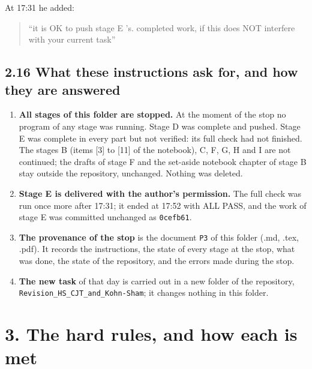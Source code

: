 \documentclass[
  10pt,
]{article}
\providecommand{\tightlist}{%
  \setlength{\itemsep}{0pt}\setlength{\parskip}{0pt}}
\begin{document}
At 17:31 he added:

\begin{quote}
``it is OK to push stage E 's. completed work, if this does NOT
interfere with your current task''
\end{quote}

\hypertarget{what-these-instructions-ask-for-and-how-they-are-answered}{%
\subsection{2.16 What these instructions ask for, and how they are
answered}\label{what-these-instructions-ask-for-and-how-they-are-answered}}

\begin{enumerate}
\def\labelenumi{\arabic{enumi}.}
\tightlist
\item
  \textbf{All stages of this folder are stopped.} At the moment of the
  stop no program of any stage was running. Stage D was complete and
  pushed. Stage E was complete in every part but not verified: its full
  check had not finished. The stages B (items {[}3{]} to {[}11{]} of the
  notebook), C, F, G, H and I are not continued; the drafts of stage F
  and the set-aside notebook chapter of stage B stay outside the
  repository, unchanged. Nothing was deleted.
\item
  \textbf{Stage E is delivered with the author's permission.} The full
  check was run once more after 17:31; it ended at 17:52 with ALL PASS,
  and the work of stage E was committed unchanged as \texttt{0cefb61}.
\item
  \textbf{The provenance of the stop} is the document \texttt{P3} of
  this folder (.md, .tex, .pdf). It records the instructions, the state
  of every stage at the stop, what was done, the state of the
  repository, and the errors made during the stop.
\item
  \textbf{The new task} of that day is carried out in a new folder of
  the repository, \texttt{Revision\_HS\_CJT\_and\_Kohn-Sham}; it changes
  nothing in this folder.
\end{enumerate}

\hypertarget{the-hard-rules-and-how-each-is-met}{%
\section{3. The hard rules, and how each is
met}\label{the-hard-rules-and-how-each-is-met}}
\end{document}
